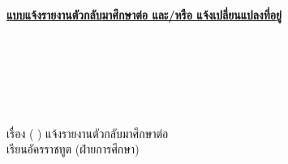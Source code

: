 \documentclass[a4paper,13pt]{article}
\begin{document}
\begin{center}
\textbf{\underline{แบบแจ้งรายงานตัวกลับมาศึกษาต่อ และ/หรือ แจ้งเปลี่ยนแปลงที่อยู่}} \\
\end{center}

\begin{flushright}
 \\
 \\
 \\
 \\
 \\
\end{flushright}

\noindent
เรื่อง ( ) แจ้งรายงานตัวกลับมาศึกษาต่อ \\
เรียน\hspace{10pt}อัครราชทูต (ฝ่ายการศึกษา) \\
\end{document}
